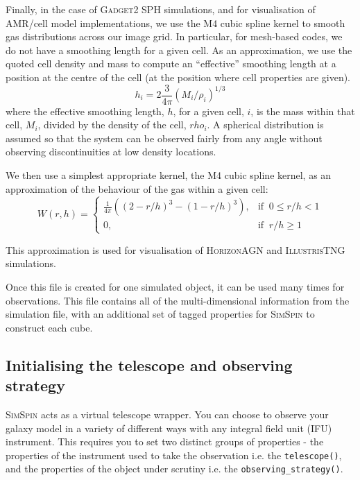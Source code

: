 \documentclass[
  journal=pasa,
  manuscript=research-paper, %
  year=2020,
  volume=37,
]{cup-journal}
\newcommand{\simspin}[1]{\textsc{SimSpin}#1} %
\newcommand{\illustristng}[1]{\textsc{IllustrisTNG}#1} %
\newcommand{\horizon}[1]{\textsc{HorizonAGN}#1} %
\newcommand{\gadget}[1]{\textsc{Gadget2}#1} %
\newcommand{\telescope}[1]{\texttt{telescope()}#1}
\newcommand{\observingstrategy}[1]{\texttt{observing\_strategy()}#1}
\begin{document}
Finally, in the case of \gadget{} SPH simulations, and for visualisation of AMR/cell model implementations, we use the M4 cubic spline kernel to smooth gas distributions across our image grid.
In particular, for mesh-based codes, we do not have a smoothing length for a given cell. 
As an approximation, we use the quoted cell density and mass to compute an ``effective'' smoothing length at a position at the centre of the cell (at the position where cell properties are given).
\begin{equation}
    h_i = 2 \frac{3}{4 \pi} \left( M_i / \rho_i\right)^{1/3}
\end{equation}
where the effective smoothing length, $h$, for a given cell, $i$, is the mass within that cell, $M_i$, divided by the density of the cell, $rho_i$. 
A spherical distribution is assumed so that the system can be observed fairly from any angle without observing discontinuities at low density locations.  

We then use a simplest appropriate kernel, the M4 cubic spline kernel, as an approximation of the behaviour of the gas within a given cell:
\begin{equation}
    W(r,h) =
    \begin{cases}
        \frac{1}{4 \pi} \left((2 - r/h)^3 - (1 - r/h)^3\right) ,& \text{if }\ 0 \leq r/h < 1\\
        0,                                     & \text{if }\ r/h \geq 1
    \end{cases}
\end{equation}

This approximation is used for visualisation of \horizon{} and \illustristng{} simulations. 

\vspace{0.5cm}

\noindent Once this file is created for one simulated object, it can be used many times for observations. 
This file contains all of the multi-dimensional information from the simulation file, with an additional set of tagged properties for \simspin{} to construct each cube. 


\subsection{Initialising the telescope and observing strategy}

\simspin{} acts as a virtual telescope wrapper. 
You can choose to observe your galaxy model in a variety of different ways with any integral field unit (IFU) instrument. 
This requires you to set two distinct groups of properties - the properties of the instrument used to take the observation i.e. the \telescope{}, and the properties of the object under scrutiny i.e. the \observingstrategy{}. 
\end{document}
